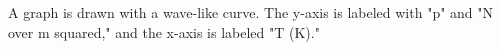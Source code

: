 A graph is drawn with a wave-like curve. The y-axis is labeled with "p" and "N over m squared," and the x-axis is labeled "T (K)."
